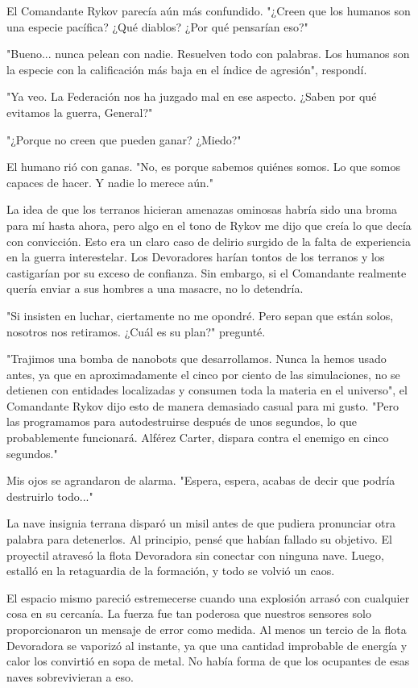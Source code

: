 \documentclass[spanish,12pt,a4paper,oneside,titlepage]{book}
\begin{document}
    El Comandante Rykov parecía aún más confundido. "¿Creen que los humanos son una especie pacífica? ¿Qué diablos? ¿Por qué pensarían eso?"

    "Bueno... nunca pelean con nadie. Resuelven todo con palabras. Los humanos son la especie con la calificación más baja en el índice de agresión", respondí.

    "Ya veo. La Federación nos ha juzgado mal en ese aspecto. ¿Saben por qué evitamos la guerra, General?"

    "¿Porque no creen que pueden ganar? ¿Miedo?"

    El humano rió con ganas. "No, es porque sabemos quiénes somos. Lo que somos capaces de hacer. Y nadie lo merece aún."

    La idea de que los terranos hicieran amenazas ominosas habría sido una broma para mí hasta ahora, pero algo en el tono de Rykov me dijo que creía lo que decía con convicción. Esto era un claro caso de delirio surgido de la falta de experiencia en la guerra interestelar. Los Devoradores harían tontos de los terranos y los castigarían por su exceso de confianza. Sin embargo, si el Comandante realmente quería enviar a sus hombres a una masacre, no lo detendría.

    "Si insisten en luchar, ciertamente no me opondré. Pero sepan que están solos, nosotros nos retiramos. ¿Cuál es su plan?" pregunté.

    "Trajimos una bomba de nanobots que desarrollamos. Nunca la hemos usado antes, ya que en aproximadamente el cinco por ciento de las simulaciones, no se detienen con entidades localizadas y consumen toda la materia en el universo", el Comandante Rykov dijo esto de manera demasiado casual para mi gusto. "Pero las programamos para autodestruirse después de unos segundos, lo que probablemente funcionará. Alférez Carter, dispara contra el enemigo en cinco segundos."

    Mis ojos se agrandaron de alarma. "Espera, espera, acabas de decir que podría destruirlo todo..."

    La nave insignia terrana disparó un misil antes de que pudiera pronunciar otra palabra para detenerlos. Al principio, pensé que habían fallado su objetivo. El proyectil atravesó la flota Devoradora sin conectar con ninguna nave. Luego, estalló en la retaguardia de la formación, y todo se volvió un caos.

    El espacio mismo pareció estremecerse cuando una explosión arrasó con cualquier cosa en su cercanía. La fuerza fue tan poderosa que nuestros sensores solo proporcionaron un mensaje de error como medida. Al menos un tercio de la flota Devoradora se vaporizó al instante, ya que una cantidad improbable de energía y calor los convirtió en sopa de metal. No había forma de que los ocupantes de esas naves sobrevivieran a eso.
\end{document}
